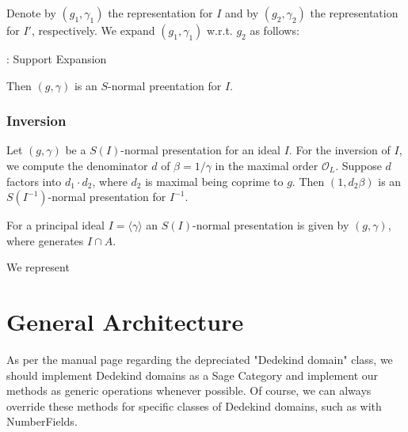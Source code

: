 \documentclass{amsart}
\theoremstyle{definition}
\def\oo{\mathcal{O}}
\begin{document}
Denote by $(g_1,\gamma_1)$ the representation for $I$ and by $(g_2,\gamma_2)$ the representation for $I'$, respectively. 
We expand $(g_1,\gamma_1)$ w.r.t. $g_2$ as follows:

\begin{algorithm}
\caption{: Support Expansion}
\label{support_expand}
\end{algorithm}
Then $(g,\gamma)$ is an $S$-normal preentation for $I$.
\subsubsection{Inversion}


Let $(g,\gamma)$ be a $S(I)$-normal presentation for an ideal $I$. For the inversion of $I$, we compute the denominator $d$ of $\beta = 1/\gamma$ in the maximal order $\oo_L$. Suppose $d$ factors into $d_1\cdot d_2$, where $d_2$ is maximal being  coprime to $g$. Then $(1,d_2\beta)$ is an $S(I^{-1})$-normal presentation for $I^{-1}$. 

For a principal ideal $I = \langle \gamma\rangle$ an $S(I)$-normal presentation is given by $(g,\gamma)$, where generates $ I\cap A$.




We represent 


	
	\section{General Architecture}
	
			As per the manual page regarding the depreciated "Dedekind domain" class, we should implement Dedekind domains as a Sage Category and implement our methods as generic operations whenever possible. Of course, we can always override these methods for specific classes of Dedekind domains, such as with NumberFields.
			
\end{document}
